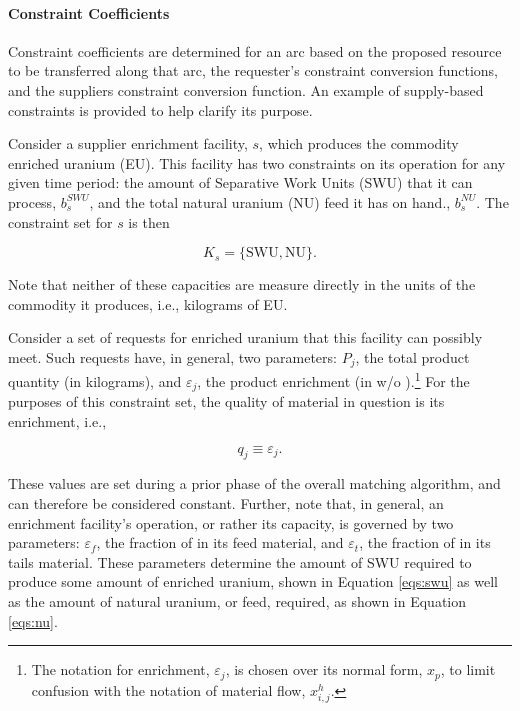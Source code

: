 \paragraph{Constraint Coefficients}

Constraint coefficients are determined for an arc based on the proposed resource
to be transferred along that arc, the requester's constraint conversion
functions, and the suppliers constraint conversion function. An example of
supply-based constraints is provided to help clarify its purpose.

Consider a supplier enrichment facility, $s$, which produces the commodity
enriched uranium (EU). This facility has two constraints on its operation for
any given time period: the amount of Separative Work Units (SWU) that it can
process, $b_{s}^{SWU}$, and the total natural uranium (NU) feed it has on hand.,
$b_{s}^{NU}$. The constraint set for $s$ is then
 
\begin{equation}\label{eqs:enr-constr-commods}
  K_{s} = \{ \mbox{SWU}, \mbox{NU} \}.
\end{equation}

Note that neither of these capacities are measure directly in the units of the
commodity it produces, i.e., kilograms of EU.

Consider a set of requests for enriched uranium that this facility can possibly
meet. Such requests have, in general, two parameters: $P_{j}$, the total product
quantity (in kilograms), and $\varepsilon_{j}$, the product enrichment (in w/o
).\footnote{The notation for enrichment, $\varepsilon_{j}$, is
  chosen over its normal form, $x_p$, to limit confusion with the notation of
  material flow, $x^h_{i,j}$.}  For the purposes of this constraint set, the
quality of material in question is its enrichment, i.e.,

\begin{equation}\label{eqs:enr-q-swu}
  q_{j} \equiv \varepsilon_{j}.
\end{equation}

These values are set during a prior phase of the overall matching algorithm, and
can therefore be considered constant. Further, note that, in general, an
enrichment facility's operation, or rather its capacity, is governed by two
parameters: $\varepsilon_{f}$, the fraction of  in its feed
material, and $\varepsilon_{t}$, the fraction of  in its tails
material. These parameters determine the amount of SWU required to produce some
amount of enriched uranium, shown in Equation \ref{eqs:swu} as well as the
amount of natural uranium, or feed, required, as shown in Equation \ref{eqs:nu}.

